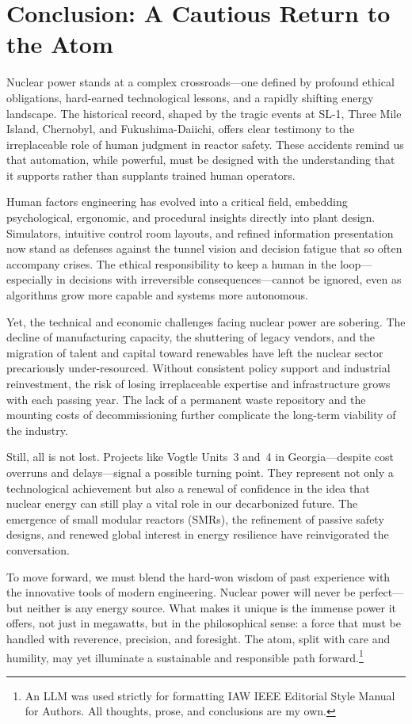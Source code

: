 \documentclass[12pt]{article}
\begin{document}
\section{Conclusion: A Cautious Return to the Atom}

Nuclear power stands at a complex crossroads—one defined by profound ethical obligations, hard-earned technological lessons, and a rapidly shifting energy landscape. The historical record, shaped by the tragic events at SL-1, Three Mile Island, Chernobyl, and Fukushima-Daiichi, offers clear testimony to the irreplaceable role of human judgment in reactor safety. These accidents remind us that automation, while powerful, must be designed with the understanding that it supports rather than supplants trained human operators.

Human factors engineering has evolved into a critical field, embedding psychological, ergonomic, and procedural insights directly into plant design. Simulators, intuitive control room layouts, and refined information presentation now stand as defenses against the tunnel vision and decision fatigue that so often accompany crises. The ethical responsibility to keep a human in the loop—especially in decisions with irreversible consequences—cannot be ignored, even as algorithms grow more capable and systems more autonomous.

Yet, the technical and economic challenges facing nuclear power are sobering. The decline of manufacturing capacity, the shuttering of legacy vendors, and the migration of talent and capital toward renewables have left the nuclear sector precariously under-resourced. Without consistent policy support and industrial reinvestment, the risk of losing irreplaceable expertise and infrastructure grows with each passing year. The lack of a permanent waste repository and the mounting costs of decommissioning further complicate the long-term viability of the industry.

Still, all is not lost. Projects like Vogtle Units~3 and~4 in Georgia—despite cost overruns and delays—signal a possible turning point. They represent not only a technological achievement but also a renewal of confidence in the idea that nuclear energy can still play a vital role in our decarbonized future. The emergence of small modular reactors (SMRs), the refinement of passive safety designs, and renewed global interest in energy resilience have reinvigorated the conversation.

To move forward, we must blend the hard-won wisdom of past experience with the innovative tools of modern engineering. Nuclear power will never be perfect—but neither is any energy source. What makes it unique is the immense power it offers, not just in megawatts, but in the philosophical sense: a force that must be handled with reverence, precision, and foresight. The atom, split with care and humility, may yet illuminate a sustainable and responsible path forward.\footnote{An LLM was used strictly for formatting IAW IEEE Editorial Style Manual
	for Authors. All thoughts, prose, and conclusions are
my own.}
\newpage
{}
\begingroup
\sloppy
\printbibliography
\endgroup
\end{document}
